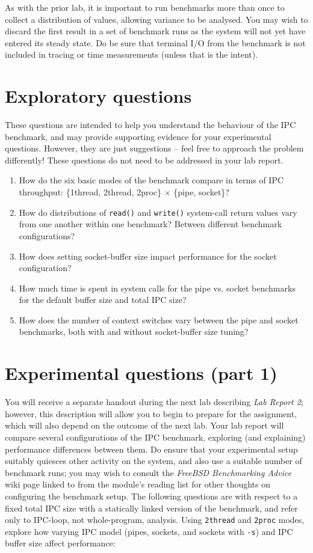 \documentclass[a4paper,10pt]{article}
\begin{document}
As with the prior lab, it is important to run benchmarks more than once to
collect a distribution of values, allowing variance to be analysed.
You may wish to discard the first result in a set of benchmark runs as the
system will not yet have entered its steady state.
Do be sure that terminal I/O from the benchmark is not included in tracing or
time measurements (unless that is the intent).

\section*{Exploratory questions}

These questions are intended to help you understand the behaviour of the IPC
benchmark, and may provide supporting evidence for your experimental
questions.
However, they are just suggestions -- feel free to approach the problem
differently!
These questions do not need to be addressed in your lab report.

\begin{enumerate}
  \item How do the six basic modes of the benchmark compare in terms of
    IPC throughput: \{1thread, 2thread, 2proc\} $\times$ \{pipe, socket\}?
  \item How do distributions of \texttt{read()} and \texttt{write()}
    system-call return values vary from one another within one benchmark?
    Between different benchmark configurations?
  \item How does setting socket-buffer size impact performance for the
    socket configuration?
  \item How much time is spent in system calls for the pipe vs. socket
    benchmarks for the default buffer size and total IPC size?
  \item How does the number of context switches vary between the pipe and
    socket benchmarks, both with and without socket-buffer size tuning?
\end{enumerate}

\section*{Experimental questions (part 1)}

You will receive a separate handout during the next lab describing \textit{Lab
Report 2}; however, this description will allow you to begin to prepare for
the assignment, which will also depend on the outcome of the next lab.
Your lab report will compare several configurations of the IPC benchmark,
exploring (and explaining) performance differences between them.
Do ensure that your experimental setup suitably quiesces other activity on the
system, and also use a suitable number of benchmark runs; you may wish to
consult the \textit{FreeBSD Benchmarking Advice} wiki page linked to from the
module's reading list for other thoughts on configuring the benchmark setup.
The following questions are with respect to a fixed total IPC size with a
statically linked version of the benchmark, and refer only to IPC-loop, not
whole-program, analysis.
Using \texttt{2thread} and \texttt{2proc} modes, explore how varying IPC model
(pipes, sockets, and sockets with \texttt{-s}) and IPC buffer size affect
performance:
\end{document}
